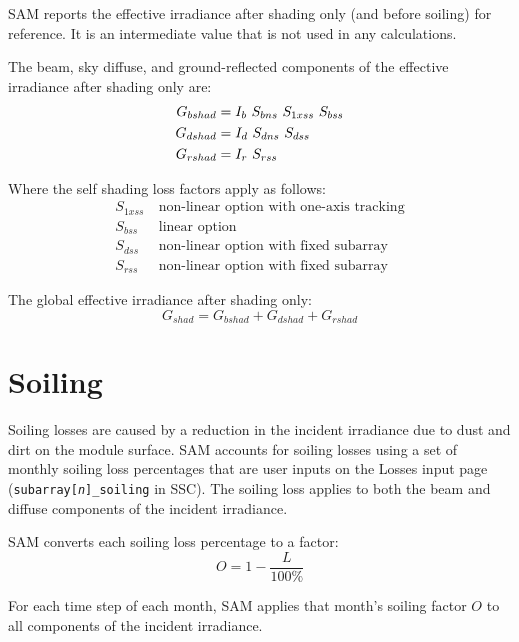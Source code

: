 \documentclass[12pt,letterpaper]{article}
\begin{document}
SAM reports the effective irradiance after shading only (and before soiling) for reference. It is an intermediate value that is not used in any calculations.

The beam, sky diffuse, and ground-reflected components of the effective irradiance after shading only are:
\begin{align}
G_{bshad} &= I_b~S_{bns}~S_{1xss}~S_{bss}\notag\\
G_{dshad} &= I_d~S_{dns}~S_{dss} \notag\\
G_{rshad} &= I_r~S_{rss}
\end{align}

Where the self shading loss factors apply as follows:
\begin{align*}
S_{1xss}&~\text{non-linear option with one-axis tracking}\\
S_{bss}& ~\text{linear option}\\
S_{dss}& ~\text{non-linear option with fixed subarray}\\
S_{rss}& ~\text{non-linear option with fixed subarray}
\end{align*}

The global effective irradiance after shading only:
\begin{equation}
G_{shad} = G_{bshad} + G_{dshad} + G_{rshad}
\end{equation}

\section{Soiling}\label{sec-soiling}

Soiling losses are caused by a reduction in the incident irradiance due to dust and dirt on the module surface. SAM accounts for soiling losses using a set of monthly soiling loss percentages that are user inputs on the Losses input page (\texttt{subarray[\textit{n}]\_soiling} in SSC). The soiling loss applies to both the beam and diffuse components of the incident irradiance.

SAM converts each soiling loss percentage to a factor:
\begin{equation}
O=1-\frac{L}{100\%}
\end{equation}

For each time step of each month, SAM applies that month's soiling factor $O$ to all components of the incident irradiance.

\end{document}

